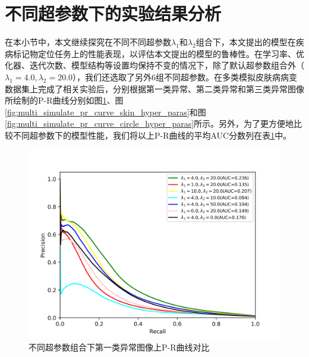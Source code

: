 \section{不同超参数下的实验结果分析}\label{sec:multi_classes_hyper_paras}
在本小节中，本文继续探究在不同不同超参数$\lambda_{1}$和$\lambda_{2}$组合下，本文提出的模型在疾病标记物定位任务上的性能表现，以评估本文提出的模型的鲁棒性。在学习率、优化器、迭代次数、模型结构等设置均保持不变的情况下，除了默认超参数组合外（$\lambda_{1}=4.0,\lambda_{2}=20.0$），我们还选取了另外$6$组不同超参数。在多类模拟皮肤病病变数据集上完成了相关实验后，分别根据第一类异常、第二类异常和第三类异常图像所绘制的P-R曲线分别如图\ref{fig:multi_simulate_pr_curve_image_net_hyper_paras}、图\ref{fig:multi_simulate_pr_curve_skin_hyper_paras}和图\ref{fig:multi_simulate_pr_curve_circle_hyper_paras}所示。另外，为了更方便地比较不同超参数下的模型性能，我们将以上P-R曲线的平均AUC分数列在表\ref{fig:multi_simulate_pr_curve_image_net_hyper_paras}中。
\begin{figure}[H]
	\centering
	\includegraphics[width=1.0\textwidth]{figure/pr_curve_multi_skin_hyper_paras/IMAGE_NET_pr_curve.png}
	\caption{不同超参数组合下第一类异常图像上P-R曲线对比} 
	\label{fig:multi_simulate_pr_curve_image_net_hyper_paras}
\end{figure}

